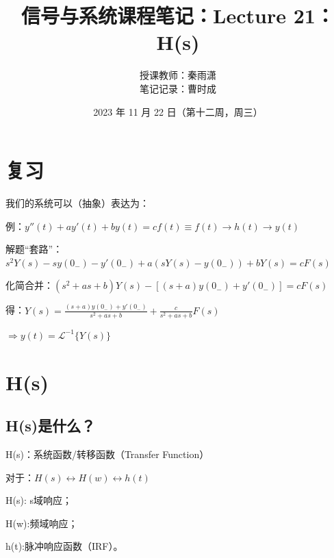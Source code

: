 \documentclass[UTF8]{ctexart}
\begin{document}
\title{信号与系统课程笔记：Lecture 21：H(s)}
\author{授课教师：秦雨潇 \\
        笔记记录：曹时成}
\date{2023 年 11 月 22 日（第十二周，周三）}
\maketitle

\section{复习}
我们的系统可以（抽象）表达为：\par
例：$y''(t) + ay'(t) + by(t) = cf(t) \equiv f(t) \rightarrow \boxed{\text{$h(t)$}} \rightarrow y(t)$ \par
解题“套路”：$s^2Y(s)-sy(0_-)-y'(0_-)+a(sY(s)-y(0_-))+bY(s)=cF(s)$ \par
化简合并：$(s^2+as+b)Y(s)-[(s+a)y(0_-)+y'(0_-) ]=cF(s) $ \par
得：$Y(s)=\frac{(s+a)y(0_-)+y'(0_-)}{s^2+as+b} +\frac{c}{s^2+as+b}F(s) $ \par
\qquad $\Longrightarrow y(t)=\mathscr{L}^{-1}\{ Y(s)\} $  \par
\section{H(s)}
\subsection{H(s)是什么？}
H(s)：系统函数/转移函数（Transfer Function）  \par
对于：$H(s)\longleftrightarrow H(w)\longleftrightarrow h(t)$ \par 
H(s): s域响应； \par 
H(w):频域响应； \par 
h(t):脉冲响应函数（IRF）。 \par 
\end{document}
